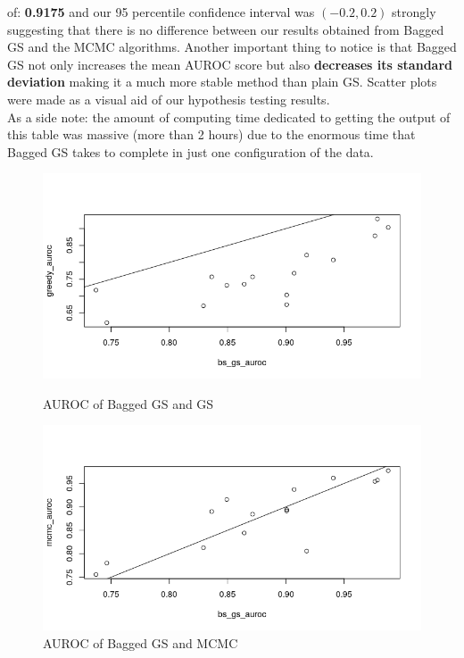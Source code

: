 \documentclass{article}
\begin{document}
	of: \textbf{0.9175} and our 95 percentile confidence interval was $(-0.2,
	0.2)$ strongly suggesting that there is no difference between our
	results obtained from Bagged GS and the MCMC algorithms. Another important
	thing to notice is that Bagged GS not only increases the mean AUROC score but
	also \textbf{decreases its standard deviation} making it a much more stable method
	than plain GS. Scatter plots were made as a visual aid of our hypothesis testing results.
	\\
	As a side note: the amount of computing time dedicated to getting the output
	of this table was massive (more than 2 hours) due to the enormous time that Bagged GS takes to
	complete in just one configuration of the data.
	\begin{figure}[ht]
		\begin{minipage}{0.48\textwidth}
			\includegraphics[width=.95\linewidth]{scatter_gs_vs_bs_gs}
			\centering
			\caption{AUROC of Bagged GS and GS}
			\label{fig:scatterBS_GS}
		\end{minipage}\hfill
		\begin{minipage}{0.48\textwidth}
			\includegraphics[width=.95\linewidth]{scatter_mcmc_vs_bs_gs}
			\centering
			\caption{AUROC of Bagged GS and MCMC}
			\label{fig:scatterMCMC_GS}
    \end{minipage}
	\end{figure}
\end{document}
